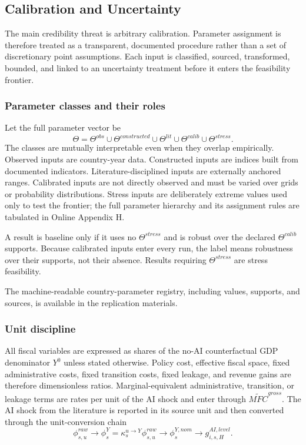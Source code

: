 \documentclass[11pt,a4paper]{article}
\begin{document}
\subsection{Calibration and Uncertainty}\label{sec:parameters}

The main credibility threat is arbitrary calibration. Parameter assignment is therefore treated as a transparent, documented procedure rather than a set of discretionary point assumptions. Each input is classified, sourced, transformed, bounded, and linked to an uncertainty treatment before it enters the feasibility frontier.

\subsubsection{Parameter classes and their roles}

Let the full parameter vector be
\begin{equation}
    \Theta=
    \Theta^{obs}\cup\Theta^{constructed}\cup\Theta^{lit}\cup\Theta^{calib}\cup\Theta^{stress}.
\end{equation}
The classes are mutually interpretable even when they overlap empirically. Observed inputs are country-year data. Constructed inputs are indices built from documented indicators. Literature-disciplined inputs are externally anchored ranges. Calibrated inputs are not directly observed and must be varied over grids or probability distributions. Stress inputs are deliberately extreme values used only to test the frontier; the full parameter hierarchy and its assignment rules are tabulated in Online Appendix H.


A result is baseline only if it uses no $\Theta^{stress}$ and is robust over the declared $\Theta^{calib}$ supports. Because calibrated inputs enter every run, the label means robustness over their supports, not their absence. Results requiring $\Theta^{stress}$ are stress feasibility.

The machine-readable country-parameter registry, including values, supports, and sources, is available in the replication materials.

\subsubsection{Unit discipline}

All fiscal variables are expressed as shares of the no-AI counterfactual GDP denominator $Y^0$ unless stated otherwise. Policy cost, effective fiscal space, fixed administrative costs, fixed transition costs, fixed leakage, and revenue gains are therefore dimensionless ratios. Marginal-equivalent administrative, transition, or leakage terms are rates per unit of the AI shock and enter through $\widetilde{MFC}^{gross}$. The AI shock from the literature is reported in its source unit and then converted through the unit-conversion chain
\begin{equation}
    \phi^{raw}_{s,u}\rightarrow \phi^Y_s=\kappa^{u\to Y}_s\phi^{raw}_{s,u}\rightarrow \phi^{Y,nom}_s\rightarrow g^{AI,level}_{i,s,H}.
\end{equation}
\end{document}

